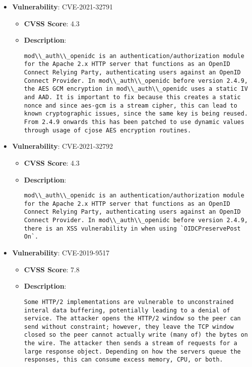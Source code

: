 \documentclass{article}
\begin{document}
\begin{itemize}
        \item \textbf{Vulnerability}: CVE-2021-32791
        \begin{itemize}
            \item \textbf{CVSS Score}:  4.3 
            \item \textbf{Description}:
            \parbox[t]{0.9\linewidth}{
                \verb|mod\\_auth\\_openidc is an authentication/authorization module for the Apache 2.x HTTP server that functions as an OpenID Connect Relying Party, authenticating users against an OpenID Connect Provider. In mod\\_auth\\_openidc before version 2.4.9, the AES GCM encryption in mod\\_auth\\_openidc uses a static IV and AAD. It is important to fix because this creates a static nonce and since aes-gcm is a stream cipher, this can lead to known cryptographic issues, since the same key is being reused. From 2.4.9 onwards this has been patched to use dynamic values through usage of cjose AES encryption routines.|
            }
        \end{itemize}
    
        \item \textbf{Vulnerability}: CVE-2021-32792
        \begin{itemize}
            \item \textbf{CVSS Score}:  4.3 
            \item \textbf{Description}:
            \parbox[t]{0.9\linewidth}{
                \verb|mod\\_auth\\_openidc is an authentication/authorization module for the Apache 2.x HTTP server that functions as an OpenID Connect Relying Party, authenticating users against an OpenID Connect Provider. In mod\\_auth\\_openidc before version 2.4.9, there is an XSS vulnerability in when using `OIDCPreservePost On`.|
            }
        \end{itemize}
    
        \item \textbf{Vulnerability}: CVE-2019-9517
        \begin{itemize}
            \item \textbf{CVSS Score}:  7.8 
            \item \textbf{Description}:
            \parbox[t]{0.9\linewidth}{
                \verb|Some HTTP/2 implementations are vulnerable to unconstrained interal data buffering, potentially leading to a denial of service. The attacker opens the HTTP/2 window so the peer can send without constraint; however, they leave the TCP window closed so the peer cannot actually write (many of) the bytes on the wire. The attacker then sends a stream of requests for a large response object. Depending on how the servers queue the responses, this can consume excess memory, CPU, or both.|
            }
        \end{itemize}
    

\end{itemize}
\end{document}
